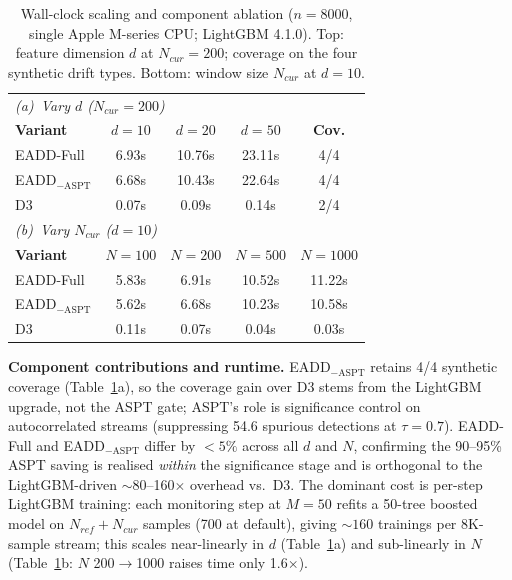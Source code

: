 \documentclass[conference,a4paper]{IEEEtran}
\begin{document}
\begin{table}[htbp]
    \caption{Wall-clock scaling and component ablation ($n{=}8000$, single Apple M-series CPU; LightGBM 4.1.0). Top: feature dimension $d$ at $N_{cur}{=}200$; coverage on the four synthetic drift types. Bottom: window size $N_{cur}$ at $d{=}10$.}
    \label{tab:runtime}
    \centering\footnotesize
    \setlength{\tabcolsep}{3pt}
    \begin{tabular*}{\columnwidth}{@{\extracolsep{\fill}}lcccc}
        \toprule
        \multicolumn{5}{l}{\textit{(a)~Vary $d$ ($N_{cur}{=}200$)}}\\
        \textbf{Variant} & \textbf{$d{=}10$} & \textbf{$d{=}20$} & \textbf{$d{=}50$} & \textbf{Cov.} \\
        \midrule
        EADD-Full         & 6.93s & 10.76s & 23.11s & 4/4 \\
        EADD$_{-\mathrm{ASPT}}$ & 6.68s & 10.43s & 22.64s & 4/4 \\
        D3                & 0.07s & 0.09s  & 0.14s  & 2/4 \\
        \midrule
        \multicolumn{5}{l}{\textit{(b)~Vary $N_{cur}$ ($d{=}10$)}}\\
        \textbf{Variant} & \textbf{$N{=}100$} & \textbf{$N{=}200$} & \textbf{$N{=}500$} & \textbf{$N{=}1000$} \\
        \midrule
        EADD-Full         & 5.83s & 6.91s & 10.52s & 11.22s \\
        EADD$_{-\mathrm{ASPT}}$ & 5.62s & 6.68s & 10.23s & 10.58s \\
        D3                & 0.11s & 0.07s & 0.04s  & 0.03s  \\
        \bottomrule
    \end{tabular*}
\end{table}

\textbf{Component contributions and runtime.} EADD$_{-\mathrm{ASPT}}$ retains 4/4 synthetic coverage (Table~\ref{tab:runtime}a), so the coverage gain over D3 stems from the LightGBM upgrade, not the ASPT gate; ASPT's role is significance control on autocorrelated streams (suppressing 54.6 spurious detections at $\tau{=}0.7$). EADD-Full and EADD$_{-\mathrm{ASPT}}$ differ by $<\!5\%$ across all $d$ and $N$, confirming the 90--95\% ASPT saving is realised \textit{within} the significance stage and is orthogonal to the LightGBM-driven $\sim$80--160$\times$ overhead vs.\ D3. The dominant cost is per-step LightGBM training: each monitoring step at $M{=}50$ refits a 50-tree boosted model on $N_{ref}{+}N_{cur}$ samples (700 at default), giving ${\sim}160$ trainings per 8K-sample stream; this scales near-linearly in $d$ (Table~\ref{tab:runtime}a) and sub-linearly in $N$ (Table~\ref{tab:runtime}b: $N$ 200$\to$1000 raises time only 1.6$\times$).
\end{document}
